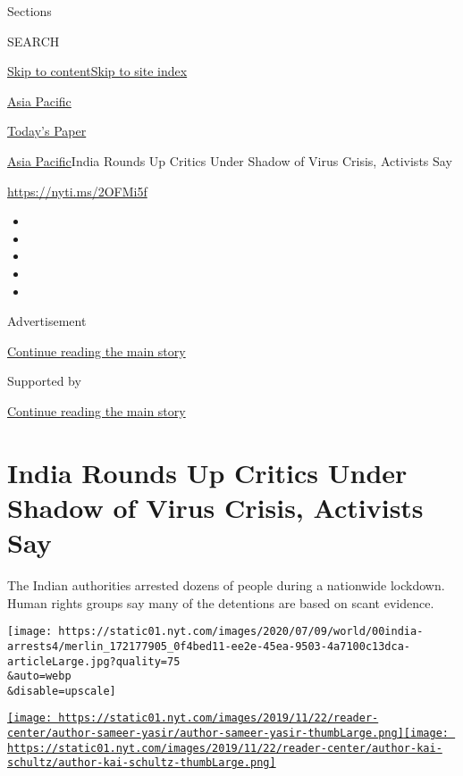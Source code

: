 Sections

SEARCH

\protect\hyperlink{site-content}{Skip to
content}\protect\hyperlink{site-index}{Skip to site index}

\href{https://www.nytimes.com/section/world/asia}{Asia Pacific}

\href{https://myaccount.nytimes.com/auth/login?response_type=cookie\&client_id=vi}{}

\href{https://www.nytimes.com/section/todayspaper}{Today's Paper}

\href{/section/world/asia}{Asia Pacific}\textbar{}India Rounds Up
Critics Under Shadow of Virus Crisis, Activists Say

\url{https://nyti.ms/2OFMi5f}

\begin{itemize}
\item
\item
\item
\item
\item
\end{itemize}

Advertisement

\protect\hyperlink{after-top}{Continue reading the main story}

Supported by

\protect\hyperlink{after-sponsor}{Continue reading the main story}

\hypertarget{india-rounds-up-critics-under-shadow-of-virus-crisis-activists-say}{%
\section{India Rounds Up Critics Under Shadow of Virus Crisis, Activists
Say}\label{india-rounds-up-critics-under-shadow-of-virus-crisis-activists-say}}

The Indian authorities arrested dozens of people during a nationwide
lockdown. Human rights groups say many of the detentions are based on
scant evidence.

\texttt{[image: https://static01.nyt.com/images/2020/07/09/world/00india-arrests4/merlin\_172177905\_0f4bed11-ee2e-45ea-9503-4a7100c13dca-articleLarge.jpg?quality=75\\\&auto=webp\\\&disable=upscale]}

\href{https://www.nytimes.com/by/sameer-yasir}{\texttt{[image: https://static01.nyt.com/images/2019/11/22/reader-center/author-sameer-yasir/author-sameer-yasir-thumbLarge.png]}}\href{https://www.nytimes.com/by/kai-schultz}{\texttt{[image: https://static01.nyt.com/images/2019/11/22/reader-center/author-kai-schultz/author-kai-schultz-thumbLarge.png]}}

